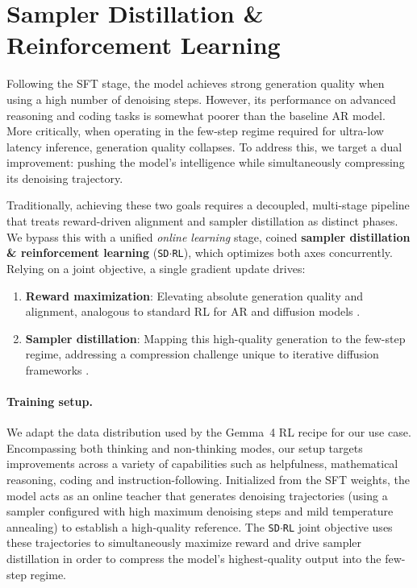 \documentclass[11pt, a4paper, logo, copyright, gdm]{google}
\newcommand{\sdrl}{\texttt{{\small SD$\cdot$RL}}\xspace}
\begin{document}
\section{Sampler Distillation \& Reinforcement Learning} \label{sec:sdrl}


Following the SFT stage, the model achieves strong generation quality when using a high number of denoising steps. However, its performance on advanced reasoning and coding tasks is somewhat poorer than the baseline AR model. More critically, when operating in the few-step regime required for ultra-low latency inference, generation quality collapses. To address this, we target a dual improvement: pushing the model's intelligence while simultaneously compressing its denoising trajectory.

Traditionally, achieving these two goals requires a decoupled, multi-stage pipeline that treats reward-driven alignment and sampler distillation as distinct phases. We bypass this with a unified \textit{online learning} stage, coined \textbf{sampler distillation \& reinforcement learning} (\sdrl), which optimizes both axes concurrently. Relying on a joint objective, a single gradient update drives:

\begin{enumerate}[topsep=0pt]
    \item \textbf{Reward maximization}: Elevating absolute generation quality and alignment, analogous to standard RL for AR and diffusion models \citep{black2024training, liu2025flow, zheng2025diffusionnft, zhao2025d1, ma2025reinforcement, wallace2023diffusion, fan2023dpok, clark2024directly, dong2023raft, lee2023aligning}.
    \item \textbf{Sampler distillation}: Mapping this high-quality generation to the few-step regime, addressing a compression challenge unique to iterative diffusion frameworks \citep{salimans2022progressive, song2023consistency, deschenaux2025beyond, fu2025learnable, luo2023latent, sauer2024adversarial, liu2023instaflow, yin2024distribution, hoogeboom2026beyond}.
\end{enumerate}


\paragraph{Training setup.} We adapt the data distribution used by the Gemma~4 RL recipe \citep{gemmateam2026gemma4technicalreport} for our use case. Encompassing both thinking and non-thinking modes, our setup targets improvements across a variety of capabilities such as helpfulness, mathematical reasoning, coding and instruction-following. Initialized from the SFT weights, the model acts as an online teacher that generates denoising trajectories (using a sampler configured with high maximum denoising steps and mild temperature annealing) to establish a high-quality reference. The \sdrl joint objective uses these trajectories to simultaneously maximize reward and drive sampler distillation in order to compress the model's highest-quality output into the few-step regime.
\end{document}
